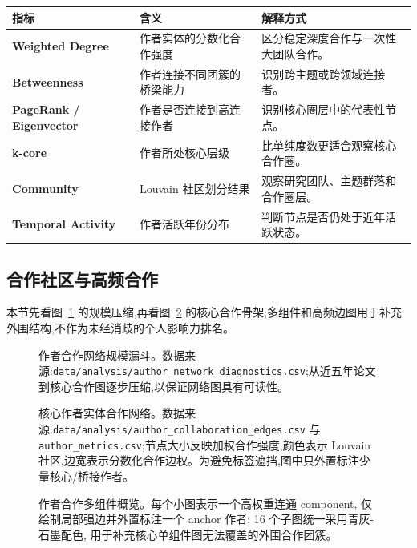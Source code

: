 \begin{tableblock}
\begin{tabularx}{\textwidth}{>{\bfseries}p{32mm}X X}
\toprule
指标 & 含义 & 解释方式 \\
\midrule
Weighted Degree & 作者实体的分数化合作强度 & 区分稳定深度合作与一次性大团队合作。 \\
Betweenness & 作者连接不同团簇的桥梁能力 & 识别跨主题或跨领域连接者。 \\
PageRank / Eigenvector & 作者是否连接到高连接作者 & 识别核心圈层中的代表性节点。 \\
k-core & 作者所处核心层级 & 比单纯度数更适合观察核心合作圈。 \\
Community & Louvain 社区划分结果 & 观察研究团队、主题群落和合作圈层。 \\
Temporal Activity & 作者活跃年份分布 & 判断节点是否仍处于近年活跃状态。 \\
\bottomrule
\end{tabularx}
\end{tableblock}

\subsection{合作社区与高频合作}
本节先看图~\ref{fig:author-network-funnel} 的规模压缩,再看图~\ref{fig:author-core-network} 的核心合作骨架;多组件和高频边图用于补充外围结构,不作为未经消歧的个人影响力排名。

\begin{figure}[!htbp]
  \centering
  \caption{作者合作网络规模漏斗。数据来源:\texttt{data/analysis/author\_network\_diagnostics.csv};从近五年论文到核心合作图逐步压缩,以保证网络图具有可读性。}
  \label{fig:author-network-funnel}
\end{figure}

\begin{figure}[!htbp]
  \centering
  \caption{核心作者实体合作网络。数据来源:\texttt{data/analysis/author\_collaboration\_edges.csv} 与 \texttt{author\_metrics.csv};节点大小反映加权合作强度,颜色表示 Louvain 社区,边宽表示分数化合作边权。为避免标签遮挡,图中只外置标注少量核心/桥接作者。}
  \label{fig:author-core-network}
\end{figure}

\begin{figure}[!htbp]
  \centering
  \caption{作者合作多组件概览。每个小图表示一个高权重连通 component, 仅绘制局部强边并外置标注一个 anchor 作者; 16 个子图统一采用青灰-石墨配色, 用于补充核心单组件图无法覆盖的外围合作团簇。}
\end{figure}

